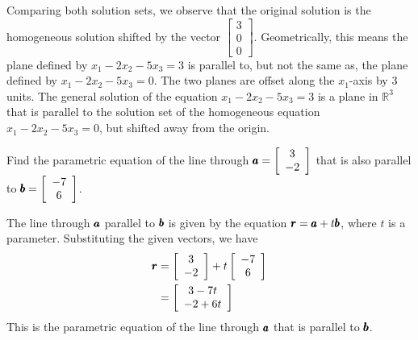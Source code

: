 \begin{solution}
        Comparing both solution sets, we observe that the original solution is the homogeneous solution shifted by the vector \(\begin{bmatrix} 3 \\ 0 \\ 0 \end{bmatrix}\). Geometrically, this means the plane defined by \( x_1 - 2 x_2 - 5 x_3 = 3 \) is parallel to, but not the same as, the plane defined by \( x_1 - 2 x_2 - 5 x_3 = 0 \). The two planes are offset along the \( x_1 \)-axis by 3 units. The general solution of the equation \( x_1 - 2 x_2 - 5 x_3 = 3 \) is a plane in \(\mathbb{R}^3\) that is parallel to the solution set of the homogeneous equation \( x_1 - 2 x_2 - 5 x_3 = 0 \), but shifted away from the origin. \end{solution}

        \begin{example} Find the parametric equation of the line through $\pmb{a}=\left[\begin{array}{c}3 \\ -2\end{array}\right]$ that is also parallel to $\pmb{b}=\left[\begin{array}{c}-7 \\ 6\end{array}\right]$.
        \end{example}

        \begin{solution}
            The line through $\pmb{a}$ parallel to $\pmb{b}$ is given by the equation $\pmb{r}=\pmb{a}+t \pmb{b}$, where $t$ is a parameter. Substituting the given vectors, we have
            \[
            \begin{aligned}
            \pmb{r} &=\left[\begin{array}{c}
            3 \\
            -2
            \end{array}\right]+t\left[\begin{array}{c}
            -7 \\
            6
            \end{array}\right] \\
            &=\left[\begin{array}{c}
            3-7 t \\
            -2+6 t
            \end{array}\right]
            \end{aligned}
            \]
            This is the parametric equation of the line through $\pmb{a}$ that is parallel to $\pmb{b}$.
        \end{solution}

